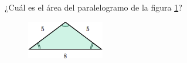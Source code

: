 ¿Cuál es el \'area del paralelogramo de la figura \ref{fig:area_isoseles_03}?
\begin{figure}[H]
    \begin{center}
        \includegraphics[width=0.3\textwidth]{../images/area_isoseles_03.png}
    \end{center}
    \caption{}
    \label{fig:area_isoseles_03}
\end{figure}
